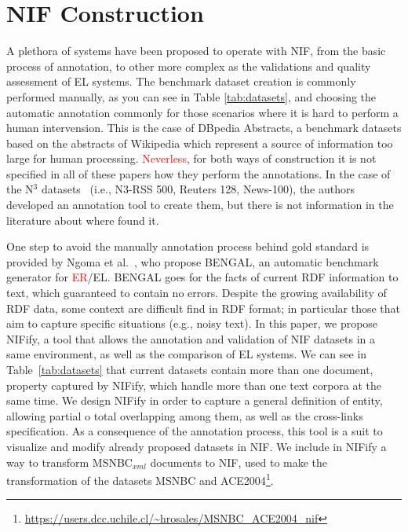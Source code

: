 \documentclass{llncs}
\begin{document}
\section{NIF Construction}
A plethora of systems have been proposed to operate with NIF, from the basic process of annotation, to other more complex as the validations and quality assessment of EL systems. The benchmark dataset creation is commonly performed manually, as you can see in Table \ref{tab:datasets}, and choosing the automatic annotation commonly for those scenarios where it is hard to perform a human intervension. This is the case of DBpedia Abstracts, a benchmark datasets based on the abstracts of Wikipedia which represent a source of information too large for human processing. \textcolor{red}{Neverless}, for both ways of construction it is not specified in all of these papers how they perform the annotations. In the case of the N$^3$ datasets~\cite{N3} (i.e., N3-RSS 500, Reuters 128, News-100), the authors developed an annotation tool to create them, but there is not information in the literature about where found it. 

One step to avoid the manually annotation process behind gold standard is provided by Ngoma et al.~\cite{Bengal2018}, who propose BENGAL, an automatic benchmark generator for \textcolor{red}{ER}/EL. BENGAL goes for the facts of current RDF information to text, which guaranteed to contain no errors. Despite the growing availability of RDF data, some context are difficult find in RDF format; in particular those that aim to capture specific situations (e.g., noisy text). %
In this paper, we propose NIFify, a tool that allows the annotation and validation of NIF datasets in a same environment, as well as the comparison of EL systems. We can see in Table~\ref{tab:datasets} that current datasets contain more than one document, property captured by NIFify, which handle more than one text corpora at the same time. We design NIFify in order to capture a general definition of entity, allowing partial o total overlapping among them, as well as the cross-links specification. As a consequence of the annotation process, this tool is a suit to visualize and modify already proposed datasets in NIF. We include in NIFify a way to transform MSNBC$_{xml}$ documents to NIF, used to make the transformation of the datasets MSNBC and ACE2004\footnote{\url{https://users.dcc.uchile.cl/~hrosales/MSNBC_ACE2004_nif}}. 
\end{document}

